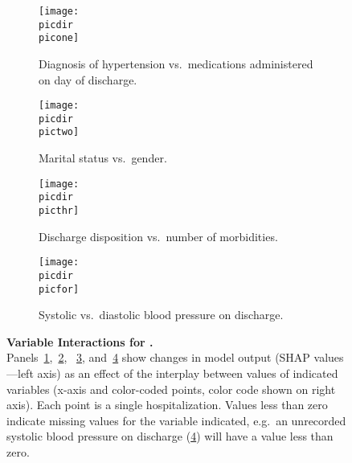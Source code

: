 \begin{figure}
\begin{adjustbox}{minipage=7.0in,frame}
\vspace{2.5mm}
\centering
%
\def\target{age}
%
\def\picdir{supplementary/\target/}
%
\def\labbig{fig:ageint}
%
\def\picone{\target_SHAP_dependence_1.pdf}
\def\pictwo{\target_SHAP_dependence_2.pdf}
\def\picthr{\target_SHAP_dependence_3.pdf}
\def\picfor{\target_SHAP_dependence_5.pdf}
\def\capone{Diagnosis of hypertension vs.\ medications administered on day of discharge.}
\def\labone{fig:ageinthtnmeds}
\def\captwo{Marital status vs.\ gender.}
\def\labtwo{fig:ageintmarriagegender}
\def\capthr{Discharge disposition vs.\ number of morbidities.}
\def\labthr{fig:ageintdispomorbid}
\def\capfor{Systolic vs.\ diastolic blood pressure on discharge.}
\def\labfor{fig:ageintsysdiabp}
%
\def\capbig{\textbf{Variable Interactions for \titlecap{\target}.} \\ %
Panels~\ref{\labone},~\ref{\labtwo}, %
~\ref{\labthr}, and~\ref{\labfor} %
show changes in model output (SHAP values---left axis) %
as an effect of the interplay between %
values of indicated variables (x-axis and color-coded points, %
color code shown on right axis).\@
Each point is a single hospitalization.\@
Values less than zero indicate missing values for the variable indicated,
e.g.\ an unrecorded systolic blood pressure on discharge (\ref{\labfor})  %
will have a value less than zero.\@
}
%
%
\begin{subfigure}[t]{.45\linewidth}
    \centering
    \captionsetup[subfigure]{}
    \caption{\capone{}}\label{\labone}
    \texttt{[image: \\picdir\\picone]}
\end{subfigure}%
\hspace{5mm}%
\begin{subfigure}[t]{.45\linewidth}
    \centering
    \captionsetup[subfigure]{}
    \caption{\captwo}\label{\labtwo}
    \texttt{[image: \\picdir\\pictwo]}
\end{subfigure}%

\vspace{5mm}
\begin{subfigure}[t]{.45\linewidth}
    \centering
    \captionsetup[subfigure]{}
    \caption{\capthr}\label{\labthr}
    \texttt{[image: \\picdir\\picthr]}
\end{subfigure}%
\hspace{5mm}%
\begin{subfigure}[t]{.45\linewidth}
    \centering
    \captionsetup[subfigure]{}
    \caption{\capfor}\label{\labfor}
    \texttt{[image: \\picdir\\picfor]}
\end{subfigure}%

\caption{\capbig}\label{\labbig}
\end{adjustbox}
\end{figure}